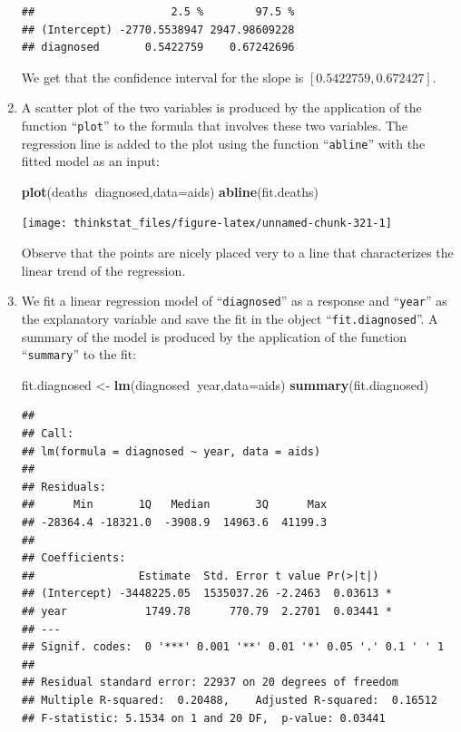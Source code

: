 \documentclass[]{krantz}
\makeatletter
\newenvironment{Shaded}{\begin{snugshade}}{\end{snugshade}}
\newcommand{\KeywordTok}[1]{\textcolor[rgb]{0.13,0.29,0.53}{\textbf{#1}}}
\newcommand{\DataTypeTok}[1]{\textcolor[rgb]{0.13,0.29,0.53}{#1}}
\newcommand{\StringTok}[1]{\textcolor[rgb]{0.31,0.60,0.02}{#1}}
\newcommand{\OperatorTok}[1]{\textcolor[rgb]{0.81,0.36,0.00}{\textbf{#1}}}
\newcommand{\NormalTok}[1]{#1}
\newenvironment{kframe}{%
\medskip{}
\setlength{\fboxsep}{.8em}
 \def\at@end@of@kframe{}%
 \ifinner\ifhmode%
  \def\at@end@of@kframe{\end{minipage}}%
  \begin{minipage}{\columnwidth}%
 \fi\fi%
 \def\FrameCommand##1{\hskip\@totalleftmargin \hskip-\fboxsep
 \colorbox{shadecolor}{##1}\hskip-\fboxsep
     \hskip-\linewidth \hskip-\@totalleftmargin \hskip\columnwidth}%
 \MakeFramed {\advance\hsize-\width
   \@totalleftmargin\z@ \linewidth\hsize
   \@setminipage}}%
 {\par\unskip\endMakeFramed%
 \at@end@of@kframe}
\renewenvironment{Shaded}{\begin{kframe}}{\end{kframe}}
\theoremstyle{definition}
\theoremstyle{definition}
\theoremstyle{definition}
\theoremstyle{remark}
\makeatother
\begin{document}
\begin{enumerate}
\begin{verbatim}
##                     2.5 %        97.5 %
## (Intercept) -2770.5538947 2947.98609228
## diagnosed       0.5422759    0.67242696
\end{verbatim}

  We get that the confidence interval for the slope is
  \([0.5422759 , 0.672427]\).
\item
  A scatter plot of the two variables is produced by the application of
  the function ``\texttt{plot}'' to the formula that involves these two
  variables. The regression line is added to the plot using the function
  ``\texttt{abline}'' with the fitted model as an input:

\begin{Shaded}
\begin{Highlighting}[]
\KeywordTok{plot}\NormalTok{(deaths}\OperatorTok{~}\NormalTok{diagnosed,}\DataTypeTok{data=}\NormalTok{aids)}
\KeywordTok{abline}\NormalTok{(fit.deaths)}
\end{Highlighting}
\end{Shaded}

  \begin{center}\texttt{[image: thinkstat\_files/figure-latex/unnamed-chunk-321-1]} \end{center}

  Observe that the points are nicely placed very to a line that
  characterizes the linear trend of the regression.
\item
  We fit a linear regression model of ``\texttt{diagnosed}'' as a
  response and ``\texttt{year}'' as the explanatory variable and save
  the fit in the object ``\texttt{fit.diagnosed}''. A summary of the
  model is produced by the application of the function
  ``\texttt{summary}'' to the fit:

\begin{Shaded}
\begin{Highlighting}[]
\NormalTok{fit.diagnosed <-}\StringTok{ }\KeywordTok{lm}\NormalTok{(diagnosed}\OperatorTok{~}\NormalTok{year,}\DataTypeTok{data=}\NormalTok{aids)}
\KeywordTok{summary}\NormalTok{(fit.diagnosed)}
\end{Highlighting}
\end{Shaded}

\begin{verbatim}
## 
## Call:
## lm(formula = diagnosed ~ year, data = aids)
## 
## Residuals:
##      Min       1Q   Median       3Q      Max 
## -28364.4 -18321.0  -3908.9  14963.6  41199.3 
## 
## Coefficients:
##                Estimate  Std. Error t value Pr(>|t|)  
## (Intercept) -3448225.05  1535037.26 -2.2463  0.03613 *
## year            1749.78      770.79  2.2701  0.03441 *
## ---
## Signif. codes:  0 '***' 0.001 '**' 0.01 '*' 0.05 '.' 0.1 ' ' 1
## 
## Residual standard error: 22937 on 20 degrees of freedom
## Multiple R-squared:  0.20488,    Adjusted R-squared:  0.16512 
## F-statistic: 5.1534 on 1 and 20 DF,  p-value: 0.03441
\end{verbatim}


\end{enumerate}
\end{document}
